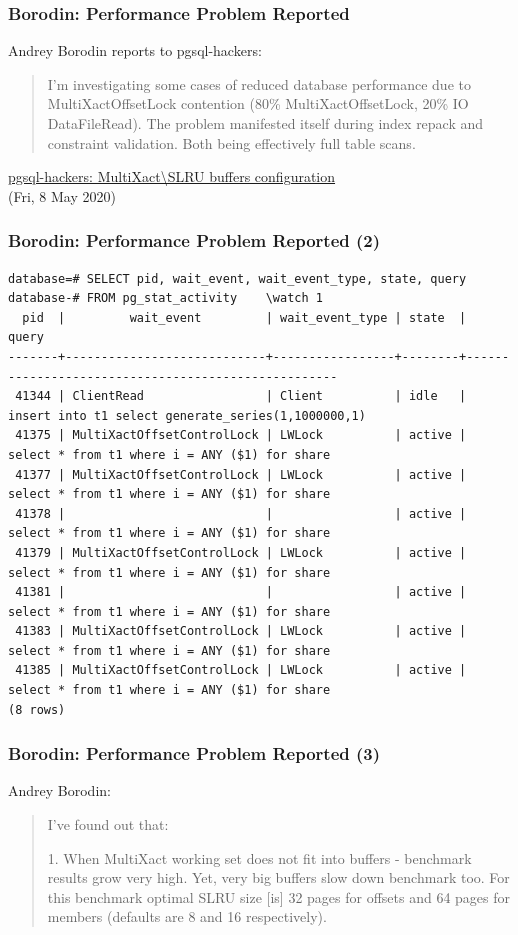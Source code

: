 \begin{frame}
  \frametitle{Borodin: Performance Problem Reported}
   Andrey Borodin reports to pgsql-hackers:
	 \begin{quote}
	    \linksize I'm investigating some cases of reduced database
	    performance due to MultiXactOffsetLock contention (80\%
	    MultiXactOffsetLock, 20\% IO DataFileRead).  The problem manifested
	    itself during index repack and constraint validation. Both being
	    effectively full table scans.
	 \end{quote}
	 {\linksize \href{https://postgr.es/m/2BEC2B3F-9B61-4C1D-9FB5-5FAB0F05EF86@yandex-team.ru}
	 {pgsql-hackers: MultiXact\textbackslash{}SLRU buffers configuration} \faExternalLink \\ (Fri, 8 May 2020) }
\end{frame}

\begin{frame}[fragile]
  \frametitle{Borodin: Performance Problem Reported (2)}

  \linksize
  \begin{verbatim}
database=# SELECT pid, wait_event, wait_event_type, state, query
database-# FROM pg_stat_activity    \watch 1
  pid  |         wait_event         | wait_event_type | state  |                       query
-------+----------------------------+-----------------+--------+----------------------------------------------------
 41344 | ClientRead                 | Client          | idle   | insert into t1 select generate_series(1,1000000,1)
 41375 | MultiXactOffsetControlLock | LWLock          | active | select * from t1 where i = ANY ($1) for share
 41377 | MultiXactOffsetControlLock | LWLock          | active | select * from t1 where i = ANY ($1) for share
 41378 |                            |                 | active | select * from t1 where i = ANY ($1) for share
 41379 | MultiXactOffsetControlLock | LWLock          | active | select * from t1 where i = ANY ($1) for share
 41381 |                            |                 | active | select * from t1 where i = ANY ($1) for share
 41383 | MultiXactOffsetControlLock | LWLock          | active | select * from t1 where i = ANY ($1) for share
 41385 | MultiXactOffsetControlLock | LWLock          | active | select * from t1 where i = ANY ($1) for share
(8 rows)
\end{verbatim}  
\end{frame}

\begin{frame}
  \frametitle{Borodin: Performance Problem Reported (3)}

  Andrey Borodin:
  \begin{quote}
I've found out that:

1. When MultiXact working set does not fit into buffers - benchmark results grow very high. Yet, very big buffers slow down benchmark
    too. For this benchmark optimal SLRU size [is] 32 pages for offsets and 64 pages for members (defaults are 8 and 16 respectively).
  \end{quote}

\end{frame}

